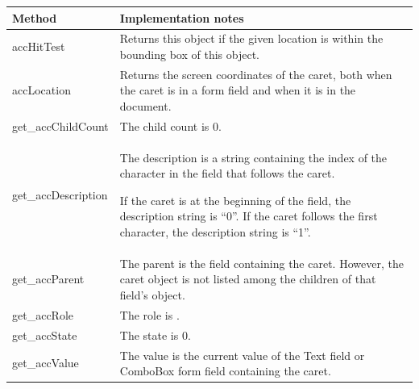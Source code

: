 \documentclass[letterpaper,12pt,english,openany,oneside]{sphinxmanual}
\begin{document}
\begin{savenotes}\sphinxattablestart
\centering
{}\label{\detokenize{MSAA_PDF:section-32}}\nobreak
\begin{tabulary}{\linewidth}[t]{|T|T|}
\hline
\sphinxstyletheadfamily 
Method
&\sphinxstyletheadfamily 
Implementation notes
\\
\hline
accHitTest
&
Returns this object if the given location is within the bounding box of this object.
\\
\hline
accLocation
&
Returns the screen coordinates of the caret, both when the caret is in a form field and when it is in the document.
\\
\hline
get\_accChildCount
&
The child count is 0.
\\
\hline
get\_accDescription
&
The description is a string containing the index of the character in the field that follows the caret.

If the caret is at the beginning of the field, the description string is “0”. If the caret follows the first character, the description string is “1”.
\\
\hline
get\_accParent
&
The parent is the field containing the caret. However, the caret  object is not listed among the children of that field’s  object.
\\
\hline
get\_accRole
&
The role is  .
\\
\hline
get\_accState
&
The state is 0.
\\
\hline
get\_accValue
&
The value is the current value of the Text field or ComboBox form field containing the caret.
\\
\hline
\end{tabulary}
\par
\sphinxattableend\end{savenotes}
\end{document}
